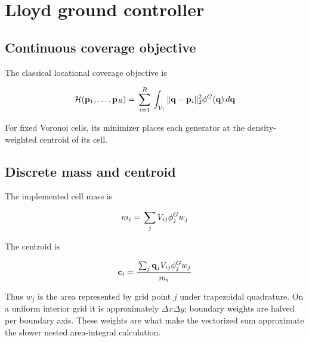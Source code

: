 \documentclass[11pt]{article}
\begin{document}
\section{Lloyd ground controller}


\subsection{Continuous coverage objective}


The classical locational coverage objective is


\begin{equation}
\mathcal H(\mathbf p_1,\ldots,\mathbf p_R) \\
= \\
\sum_{i=1}^{R} \\
\int_{\mathcal V_i} \\
\lVert\mathbf q-\mathbf p_i\rVert_2^2 \\
\phi^G(\mathbf q)\,d\mathbf q
\end{equation}


For fixed Voronoi cells, its minimizer places each generator at the density-weighted centroid of its cell.


\subsection{Discrete mass and centroid}


The implemented cell mass is


\begin{equation}
m_i \\
= \\
\sum_j \\
V_{ij}\phi^G_jw_j
\end{equation}


The centroid is


\begin{equation}
\mathbf c_i \\
= \\
\frac{ \\
\sum_j \\
\mathbf q_jV_{ij}\phi^G_jw_j \\
}{ \\
m_i \\
}
\end{equation}


Thus $w_j$ is the area represented by grid point $j$ under trapezoidal quadrature. On a uniform interior grid it is approximately $\Delta x\Delta y$; boundary weights are halved per boundary axis. These weights are what make the vectorized sum approximate the slower nested area-integral calculation.
\end{document}
